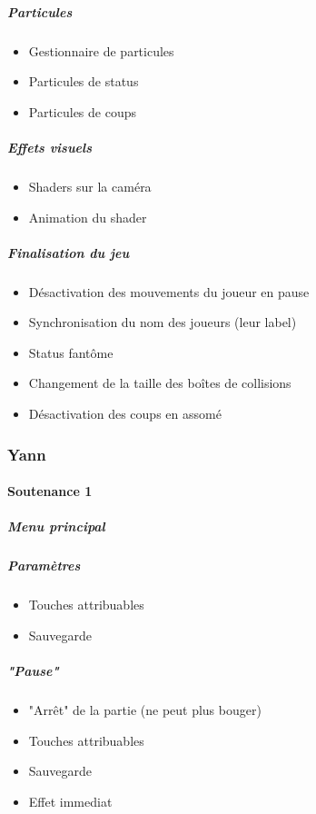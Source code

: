 \documentclass{article}
\begin{document}
\subparagraph{Particules}

\begin{itemize}
    \item Gestionnaire de particules
    \item Particules de status
    \item Particules de coups
\end{itemize}

\subparagraph{Effets visuels}

\begin{itemize}
    \item Shaders sur la caméra
    \item Animation du shader
\end{itemize}

\subparagraph{Finalisation du jeu}

\begin{itemize}
    \item Désactivation des mouvements du joueur en pause
    \item Synchronisation du nom des joueurs (leur label)
    \item Status fantôme
    \item Changement de la taille des boîtes de collisions
    \item Désactivation des coups en assomé
\end{itemize}


\newpage
\subsubsection{Yann}

\paragraph{Soutenance 1}

\subparagraph{Menu principal}

\subparagraph{Paramètres}

\begin{itemize}
	\item Touches attribuables
	\item Sauvegarde
\end{itemize}

\subparagraph{"Pause"}

\begin{itemize}
	\item "Arrêt" de la partie (ne peut plus bouger)
	\item Touches attribuables
	\item Sauvegarde
	\item Effet immediat
\end{itemize}
\end{document}
